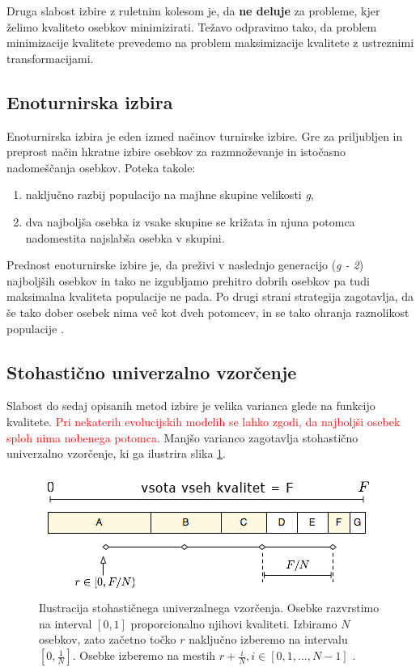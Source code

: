 \documentclass[a4paper, 12pt]{book}
\begin{document}
Druga slabost izbire z ruletnim kolesom je, da \textbf{ne deluje} za probleme, kjer \v zelimo kvaliteto osebkov minimizirati. Te\v zavo odpravimo tako, da problem minimizacije kvalitete prevedemo na problem maksimizacije kvalitete z ustreznimi transformacijami.

\subsection{Enoturnirska izbira}
Enoturnirska izbira je eden izmed na\v cinov turnirske izbire. Gre za priljubljen in preprost na\v cin hkratne izbire osebkov za razmno\v zevanje in isto\v casno nadome\v s\v canja osebkov. Poteka takole:
\begin{enumerate}
\item naklju\v cno razbij populacijo na majhne skupine velikosti \textit{g},
\item dva najbolj\v sa osebka iz vsake skupine se kri\v zata in njuna potomca nadomestita najslab\v sa osebka v skupini.
\end{enumerate}

Prednost enoturnirske izbire je, da pre\v zivi v naslednjo generacijo (\textit{g - 2}) najbolj\v sih osebkov in tako ne izgubljamo prehitro dobrih osebkov pa tudi maksimalna kvaliteta populacije ne pada. Po drugi strani strategija zagotavlja, da \v se tako dober osebek nima ve\v c kot dveh potomcev, in se tako ohranja raznolikost populacije
\cite{inteligentni sistemi}.

\subsection{Stohasti\v cno univerzalno vzor\v cenje}
Slabost do sedaj opisanih metod izbire je velika varianca glede na funkcijo kvalitete. \textcolor{red}{Pri nekaterih evolucijskih modelih se lahko zgodi, da najbolj\v si osebek sploh nima nobenega potomca}. Manj\v so varianco zagotavlja stohasti\v cno univerzalno vzor\v cenje, ki ga ilustrira slika \ref{fig:stohasticno univerzalno vzorcenje}.

\begin{figure}
\begin{center}
\includegraphics[scale=0.75]{stohasticno_univerzalno_vzorcenje.png}
\end{center}
\caption{Ilustracija stohasti\v cnega univerzalnega vzor\v cenja. Osebke razvrstimo na interval $[0, 1]$ proporcionalno njihovi kvaliteti. Izbiramo $N$ osebkov, zato za\v cetno to\v cko $r$ naklju\v cno izberemo na intervalu $[0, \frac{1}{N}]$. Osebke izberemo na mestih $r + \frac{i}{N}, i \in [0, 1, \dots, N-1]$ \cite{inteligentni sistemi}.}
\label{fig:stohasticno univerzalno vzorcenje}
\end{figure}
\end{document}
